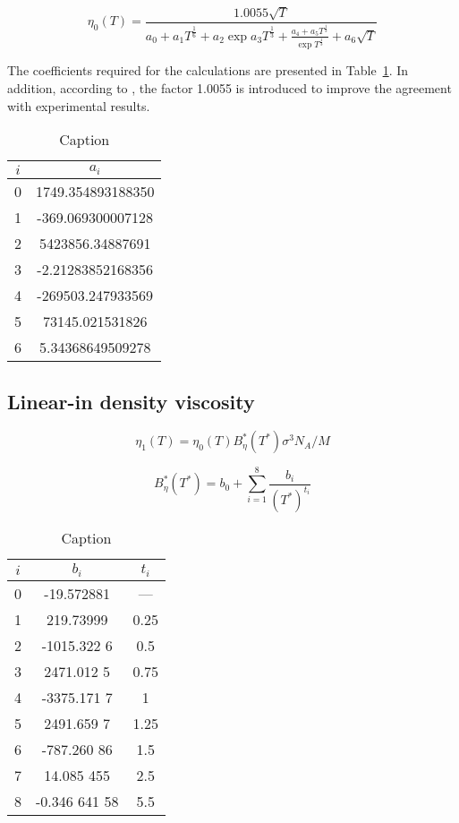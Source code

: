\begin{equation}
    \eta_0(T) = \frac{1.0055\sqrt{T}}{a_0 + a_1T^{\frac{1}{6}}+ a_2\exp{a_3T^{\frac{1}{3}}} + \frac{a_4 + a_5T^{\frac{1}{3}}}{\exp{T^{\frac{1}{3}}}} + a_6\sqrt{T}}
\end{equation}

The coefficients required for the calculations are presented in
Table~\ref{ZeroDensityCoef}. In addition, according to
\cite{laesecke2017reference}, the factor 1.0055 is introduced to improve the
agreement with experimental results.

\begin{table}[h]
    \centering
    \begin{tabular}{c|c}
        $i$ & $a_i$\\
        \hline  
        0 & 1749.354893188350\\
        1 & -369.069300007128\\
        2 & 5423856.34887691\\
        3 & -2.21283852168356\\
        4 & -269503.247933569\\
        5 & 73145.021531826\\
        6 & 5.34368649509278\\
    \end{tabular}
    \caption{Caption}
    \label{ZeroDensityCoef}
\end{table}


\subsection{Linear-in density viscosity}

\begin{equation}
    \eta_1(T) = \eta_0(T)B^*_\eta(T^*)\sigma^3N_A/M 
\end{equation}

\begin{equation}
    B^*_\eta(T^*)=b_0+\sum^8_{i=1}\frac{b_i}{(T^*)^{t_i}}
\end{equation}

\begin{table}[ht]
    \centering
    \begin{tabular}{c|c|c}
    $i$&$b_i$&$t_i$\\
    \hline
    0   & -19.572881    &—\\  
    1   & 219.73999     &0.25\\       
    2   & -1015.322 6   &0.5 \\   
    3   & 2471.012 5    &0.75\\   
    4   & -3375.171 7   &1  \\
    5   & 2491.659 7    &1.25\\   
    6   & -787.260 86   &1.5 \\   
    7   & 14.085 455    &2.5 \\   
    8   & -0.346 641 58 &5.5\\
    \end{tabular}
    \caption{Caption}
    \label{tab:my_label2}
\end{table}

